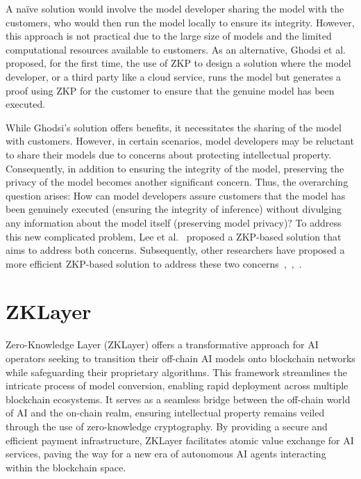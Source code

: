 \documentclass[conference]{IEEEtran}
\begin{document}
A naïve solution would involve the model developer sharing the model with the customers, who would then run the model locally to ensure its integrity. However, this approach is not practical due to the large size of models and the limited computational resources available to customers. As an alternative, Ghodsi et al.~\cite{Ghodsi2017SafetyNetsVE} proposed, for the first time, the use of ZKP to design a solution where the model developer, or a third party like a cloud service, runs the model but generates a proof using ZKP for the customer to ensure that the genuine model has been executed.

While Ghodsi's solution offers benefits, it necessitates the sharing of the model with customers. However, in certain scenarios, model developers may be reluctant to share their models due to concerns about protecting intellectual property. Consequently, in addition to ensuring the integrity of the model, preserving the privacy of the model becomes another significant concern. Thus, the overarching question arises: How can model developers assure customers that the model has been genuinely executed (ensuring the integrity of inference) without divulging any information about the model itself (preserving model privacy)? To address this new complicated problem, Lee et al.~\cite{Lee2020vCNNVC} proposed a ZKP-based solution that aims to address both concerns. Subsequently, other researchers have proposed a more efficient ZKP-based solution to address these two concerns~\cite{Liu2021zkCNNZK},~\cite{Feng2021ZENAO},~\cite{Ju2021EfficientSP}.





\section{ZKLayer}

Zero-Knowledge Layer (ZKLayer) offers a transformative approach for AI operators seeking to transition their off-chain AI models onto blockchain networks while safeguarding their proprietary algorithms. This framework streamlines the intricate process of model conversion, enabling rapid deployment across multiple blockchain ecosystems. It serves as a seamless bridge between the off-chain world of AI and the on-chain realm, ensuring intellectual property remains veiled through the use of zero-knowledge cryptography. By providing a secure and efficient payment infrastructure, ZKLayer facilitates atomic value exchange for AI services, paving the way for a new era of autonomous AI agents interacting within the blockchain space.
\end{document}

